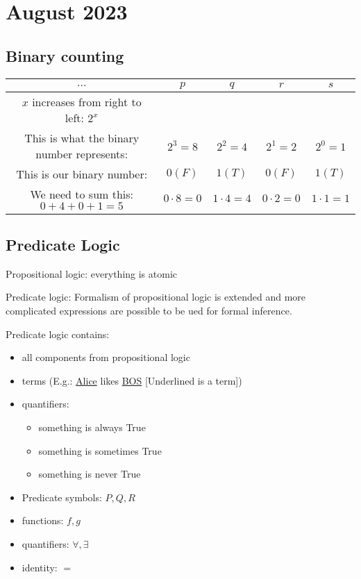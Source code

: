 \documentclass{article}
\let\stdsection\section
\renewcommand\section{\newpage\stdsection}
\begin{document}
\section{ August 2023}

\subsection{Binary counting}

\begin{tabular}{|c|c|c|c|c|}
  \hline
  $\dots$ & $p$ & $q$ & $r$ & $s$ \\ \hline
  $x$ increases from right to left: $2^{x}$ & & & & \\
  This is what the binary number represents: & $2^3 = 8$ & $2^2 = 4$ & $2^1 = 2$ & $2^0 = 1$ \\ \hline
  This is our binary number: & $0 \left( F \right)$ & $1 \left( T \right)$ & $0 \left( F \right)$ & $1 \left( T \right)$ \\ \hline
  We need to sum this: $0 + 4 + 0 + 1 = 5$ & $0 \cdot 8 = 0$ & $1 \cdot 4 = 4$ & $0 \cdot 2 = 0$ & $1 \cdot 1 = 1$ \\ \hline
\end{tabular} \vspace{.5cm}


\subsection{Predicate Logic}

Propositional logic: everything is atomic

Predicate logic: Formalism of propositional logic is extended and more complicated expressions are possible to be ued for formal inference.

Predicate logic contains:

\begin{itemize}
  \item all components from propositional logic
  \item terms (E.g.: \underline{Alice} likes \underline{BOS} [Underlined is a term])
  \item quantifiers:
  \begin{itemize}
    \item something is always True
    \item something is sometimes True
    \item something is never True
  \end{itemize}
  \item Predicate symbols: $P, Q, R$
  \item functions: $f, g$
  \item quantifiers: $\forall, \exists$
  \item identity: $=$
\end{itemize}
\end{document}

